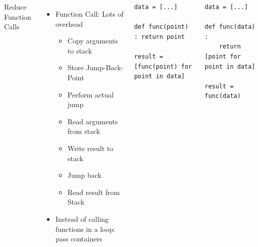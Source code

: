 \begin{frame}[fragile]
%
\begin{columns}[T]
\begin{Large}
	{Reduce Function Calls}
	\vspace{6pt}
\end{Large}
%
\begin{itemize}
\item Function Call: Lots of overhead
	\begin{itemize}
	\item Copy arguments to stack
	\item Store Jump-Back-Point
	\item Perform actual jump
	\item Read arguments from stack
	\item Write result to stack
	\item Jump back
	\item Read result from Stack
	\end{itemize}
\item Instead of calling functions in a loop: pass containers
\end{itemize}
%
\begin{warnbox}[Example: Many Function Calls, leftupper=7mm]
\begin{verbatim}
data = [...]

def func(point) : return point

result = [func(point) for point in data]
\end{verbatim}
\end{warnbox}
%
\begin{codebox}
\begin{verbatim}
data = [...]

def func(data) :
    return [point for point in data]

result = func(data)
\end{verbatim}
\end{codebox}
\end{columns}
%
\end{frame}



